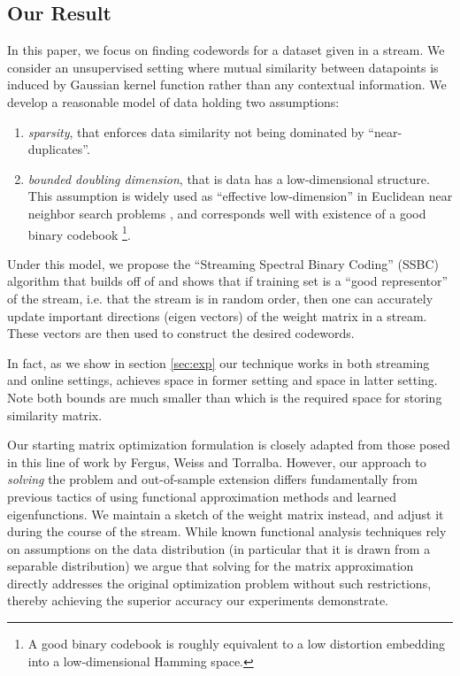 \documentclass{sig-alternate}
\begin{document}
\subsection{Our Result}
 In this paper, we focus on finding codewords for a dataset  given in a stream. We consider an unsupervised setting where mutual similarity between datapoints is induced by Gaussian kernel function  rather than any contextual information. 
We develop a reasonable model of data holding two assumptions:
\begin{enumerate}
\item \textit{sparsity},  that enforces data similarity not being dominated by ``near-duplicates''.
\item \textit{bounded doubling dimension}, that is data has a low-dimensional structure. This assumption is widely used  as ``effective low-dimension'' in Euclidean near neighbor search problems \cite{KRu,KLee,BKL06,CG06,IN07,HPK13-lowd,abdullah}, and corresponds well with existence of a good binary codebook \footnote{A good binary codebook is roughly equivalent to a low distortion embedding into a low-dimensional Hamming space.}.
\end{enumerate}
Under this model, we propose the ``Streaming Spectral Binary Coding'' (SSBC) algorithm that builds off of \fd and shows that if training set is a ``good representor'' of the stream, i.e. that the stream is in random order, then one can accurately update important directions (eigen vectors) of the weight matrix in a stream. These vectors are then used to construct the desired codewords.

In fact, as we show in section \ref{sec:exp} our technique works in both streaming and online settings, achieves  space in former setting and  space in latter setting. Note both bounds are much smaller than  which is the required space for storing similarity matrix. 

Our starting matrix optimization formulation is closely adapted from those posed in this line of work by Fergus, Weiss and Torralba. 
However, our approach to \emph{solving} the problem and out-of-sample extension differs fundamentally from previous tactics of using functional approximation methods and learned eigenfunctions. We maintain a sketch of the weight matrix instead, and adjust it during the course of the stream. 
While known functional analysis techniques rely on assumptions on the data distribution (in particular that it is drawn from a separable distribution) we argue that solving for the matrix approximation directly addresses the original optimization problem without such restrictions, thereby achieving the superior accuracy our experiments demonstrate.
\end{document}
